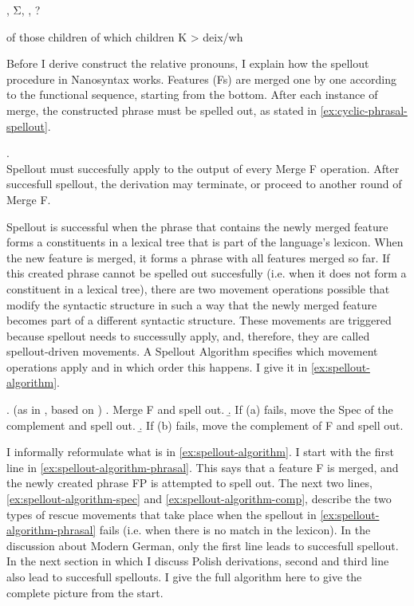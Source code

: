 , Σ, , ?

of those children
of which children
K > deix/wh

Before I derive construct the relative pronouns, I explain how the spellout procedure in Nanosyntax works. Features (Fs) are merged one by one according to the functional sequence, starting from the bottom. After each instance of merge, the constructed phrase must be spelled out, as stated in \ref{ex:cyclic-phrasal-spellout}.

\ex.  \citep{caha2020a}\\
Spellout must succesfully apply to the output of every Merge F operation. After succesfull spellout, the derivation may terminate, or proceed to another round of Merge F.\label{ex:cyclic-phrasal-spellout}

Spellout is successful when the phrase that contains the newly merged feature forms a constituents in a lexical tree that is part of the language's lexicon.
When the new feature is merged, it forms a phrase with all features merged so far.
If this created phrase cannot be spelled out succesfully (i.e. when it does not form a constituent in a lexical tree), there are two movement operations possible that modify the syntactic structure in such a way that the newly merged feature becomes part of a different syntactic structure.
These movements are triggered because spellout needs to successully apply, and, therefore, they are called spellout-driven movements.
A Spellout Algorithm specifies which movement operations apply and in which order this happens. I give it in \ref{ex:spellout-algorithm}.

\ex.  (as in \citealt{caha2020a}, based on \citealt{starke2018})\label{ex:spellout-algorithm}
 \a. Merge F and spell out.\label{ex:spellout-algorithm-phrasal}
 \b. If (a) fails, move the Spec of the complement and spell out.\label{ex:spellout-algorithm-spec}
 \b. If (b) fails, move the complement of F and spell out.\label{ex:spellout-algorithm-comp}

I informally reformulate what is in \ref{ex:spellout-algorithm}. I start with the first line in \ref{ex:spellout-algorithm-phrasal}. This says that a feature F is merged, and the newly created phrase FP is attempted to spell out.
The next two lines, \ref{ex:spellout-algorithm-spec} and \ref{ex:spellout-algorithm-comp}, describe the two types of rescue movements that take place when the spellout in \ref{ex:spellout-algorithm-phrasal} fails (i.e. when there is no match in the lexicon).
In the discussion about Modern German, only the first line leads to succesfull spellout. In the next section in which I discuss Polish derivations, second and third line also lead to succesfull spellouts. I give the full algorithm here to give the complete picture from the start.

